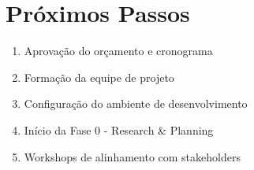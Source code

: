 \section{Próximos Passos}

\begin{enumerate}
    \item Aprovação do orçamento e cronograma
    \item Formação da equipe de projeto
    \item Configuração do ambiente de desenvolvimento
    \item Início da Fase 0 - Research \& Planning
    \item Workshops de alinhamento com stakeholders
\end{enumerate}

